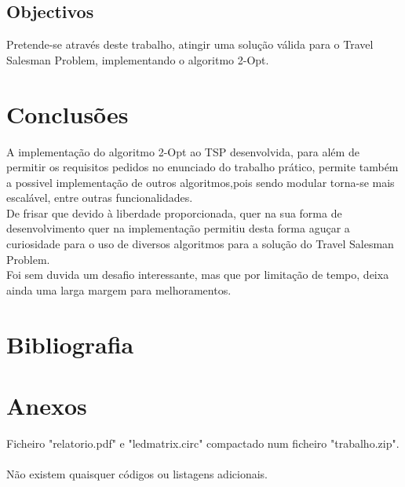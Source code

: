 \documentclass[12pt,a4paper,portrait]{article}
\begin{document}
		\subsection{Objectivos}
			Pretende-se através deste trabalho, atingir uma solução válida para o Travel Salesman Problem, implementando o algoritmo 2-Opt.\\
	\section{Conclusões}
		A implementação do algoritmo 2-Opt ao TSP desenvolvida, para além de permitir os requisitos pedidos no enunciado do trabalho prático, permite também a possivel implementação de outros algoritmos,pois sendo modular torna-se mais escalável, entre outras funcionalidades.\\
		De frisar que devido à liberdade proporcionada, quer na sua forma de desenvolvimento quer na implementação permitiu desta forma aguçar a curiosidade para o uso de diversos algoritmos para a solução do Travel Salesman Problem.\\
		Foi sem duvida um desafio interessante, mas que por limitação de tempo, deixa ainda uma larga margem para melhoramentos.\\
	\newpage
	\section{Bibliografia}
	
	

	\newpage
	\section{Anexos}
		Ficheiro "relatorio.pdf" e "ledmatrix.circ" compactado num ficheiro "trabalho.zip".\\\\
		Não existem quaisquer códigos ou listagens adicionais.\\					
\end{document}
